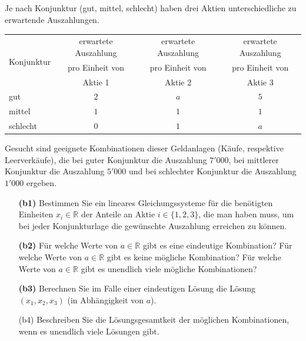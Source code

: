 \subsection*{}
Je nach Konjunktur (gut, mittel, schlecht) haben drei Aktien unterschiedliche zu erwartende Auszahlungen.
\begin{table}[H]
	\centering
	\begin{tabular}{|l |c |c |c|}
		\hline
		\multirow{3}{*}{Konjunktur}
		& erwartete Auszahlung	& erwartete Auszahlung & erwartete Auszahlung\\
		& pro Einheit von & pro Einheit von & pro Einheit von\\
		& Aktie 1 & Aktie 2	& Aktie 3\\
		\hline
		gut & $ 2 $  &  $ a $ &  $ 5 $ \\ 
		\hline
		mittel & $ 1 $ & $ 1 $ & $ 1 $  \\ 
		\hline
		schlecht & $ 0 $ & $ 1 $ & $ a $ \\
		\hline
	\end{tabular}%
\end{table}
Gesucht sind geeignete Kombinationen dieser Geldanlagen (Käufe, respektive Leerverkäufe), die bei guter Konjunktur die Auszahlung $ 7'000 $, bei mittlerer Konjunktur die Auszahlung $ 5'000 $ und bei schlechter Konjunktur die Auszahlung $ 1'000 $ ergeben.
\begin{enumerate}
	\item[\textbf{(b1)}]
	Bestimmen Sie ein lineares Gleichungssysteme für die benötigten Einheiten $ x_i \in \mathbb{R} $ der Anteile an Aktie $ i \in \{1,2,3\} $, die man haben muss, um bei jeder Konjunkturlage die gewünschte Auszahlung erreichen zu können.
	\item[\textbf{(b2)}] 
	Für welche Werte von $ a \in \mathbb{R} $ gibt es eine eindeutige Kombination?
	Für welche Werte von $ a \in \mathbb{R} $ gibt es keine mögliche Kombination?
	Für welche Werte von $ a \in \mathbb{R} $ gibt es unendlich viele mögliche Kombinationen?
	\item[\textbf{(b3)}]
	Berechnen Sie im Falle einer eindeutigen Lösung die Lösung $ (x_1,x_2,x_3) $ (in Abhängigkeit von $ a $).
	\item[(b4)]
	Beschreiben Sie die Lösungsgesamtkeit der möglichen Kombinationen, wenn es unendlich viele Lösungen gibt.
\end{enumerate}

\ \\
